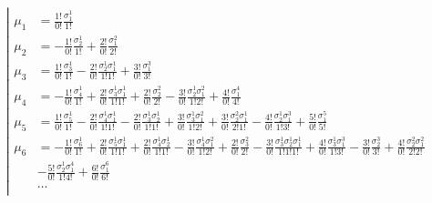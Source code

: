 \begin{equation*} \left| \begin{aligned}
\mu_1 &= 
  \frac{1!}{0!} \frac{\sigma_1^1}{1!}
\\
\mu_2 &= 
- \frac{1!}{0!} \frac{\sigma_2^1}{1!} 
+ \frac{2!}{0!} \frac{\sigma_1^2}{2!}
\\
\mu_3 &= 
  \frac{1!}{0!} \frac{\sigma_3^1}{1!} 
- \frac{2!}{0!} \frac{\sigma_2^1 \sigma_1^1}{1!1!} 
+ \frac{3!}{0!} \frac{\sigma_1^3}{3!}
\\
\mu_4 &= 
- \frac{1!}{0!} \frac{\sigma_4^1}{1!} 
+ \frac{2!}{0!} \frac{\sigma_3^1 \sigma_1^1}{1!1!} 
+ \frac{2!}{0!} \frac{\sigma_2^2}{2!}
- \frac{3!}{0!} \frac{\sigma_2^1 \sigma_1^2}{1!2!}
+ \frac{4!}{0!} \frac{\sigma_1^4}{4!}
\\
\mu_5 &=
  \frac{1!}{0!} \frac{\sigma_5^1}{1!} 
- \frac{2!}{0!} \frac{\sigma_4^1 \sigma_1^1}{1!1!} 
- \frac{2!}{0!} \frac{\sigma_3^1 \sigma_2^1}{1!1!}
+ \frac{3!}{0!} \frac{\sigma_3^1 \sigma_1^2}{1!2!}
+ \frac{3!}{0!} \frac{\sigma_2^2 \sigma_1^1}{2!1!}
- \frac{4!}{0!} \frac{\sigma_2^1 \sigma_1^3}{1!3!}
+ \frac{5!}{0!} \frac{\sigma_1^5}{5!}
\\
\mu_6 &=
- \frac{1!}{0!} \frac{\sigma_6^1}{1!} 
+ \frac{2!}{0!} \frac{\sigma_5^1 \sigma_1^1}{1!1!} 
+ \frac{2!}{0!} \frac{\sigma_4^1 \sigma_2^1}{1!1!}
- \frac{3!}{0!} \frac{\sigma_4^1 \sigma_1^2}{1!2!}
+ \frac{2!}{0!} \frac{\sigma_3^2}{2!}
- \frac{3!}{0!} \frac{\sigma_3^1 \sigma_2^1 \sigma_1^1}{1!1!1!}
+ \frac{4!}{0!} \frac{\sigma_3^1 \sigma_1^3}{1!3!}
- \frac{3!}{0!} \frac{\sigma_2^3}{3!}
+ \frac{4!}{0!} \frac{\sigma_2^2 \sigma_1^2}{2!2!} \\ &
- \frac{5!}{0!} \frac{\sigma_2^1 \sigma_1^4}{1!4!}
+ \frac{6!}{0!} \frac{\sigma_1^6}{6!}
\\
&\ldots
\\
\end{aligned} \right. \end{equation*}
